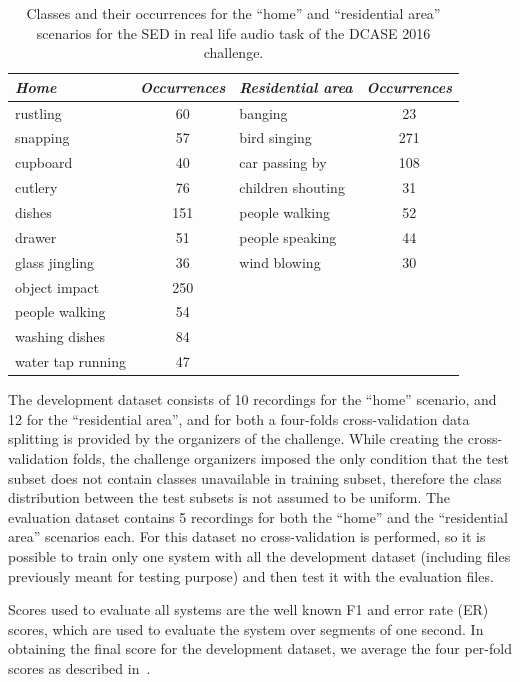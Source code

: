 \begin{table}[h]
	\centering
	\begin{tabular}{l c l c}\toprule
		\emph{Home} & \emph{Occurrences} & \emph{Residential area} & \emph{Occurrences}\\
		\midrule
		rustling & 60 & banging & 23\\
		snapping & 57 & bird singing & 271\\
		cupboard & 40 & car passing by & 108\\
		cutlery & 76 & children shouting & 31\\
		dishes & 151 & people walking & 52 \\
		drawer & 51 & people speaking & 44\\
		glass jingling & 36 & wind blowing & 30\\
		object impact & 250\\
		people walking & 54\\
		washing dishes & 84\\
		water tap running & 47\\
		\bottomrule
	\end{tabular}
	\caption[Classes of DCASE 2016 task 3 dataset]{Classes and their occurrences for the ``home'' and ``residential area'' scenarios for the SED in real life audio task of the DCASE 2016 challenge.}
	\label{tab:classes}
\end{table}

The development dataset consists of 10 recordings for the ``home'' scenario, and 12 for the ``residential area'', and for both a four-folds cross-validation data splitting is provided by the organizers of the challenge. While creating the cross-validation folds, the challenge organizers imposed the only condition that the test subset does not contain classes unavailable in training subset, therefore the class distribution between the test subsets is not assumed to be uniform.
The evaluation dataset contains 5 recordings for both the ``home'' and the ``residential area'' scenarios each. For this dataset no cross-validation is performed, so it is possible to train only one system with all the development dataset (including files previously meant for testing purpose) and then test it with the evaluation files.

Scores used to evaluate all systems are the well known F1 and error rate (ER) scores, which are used to evaluate the system over segments of one second. In obtaining the final score for the development dataset, we average the four per-fold scores as described in~\cite{mesaros2016tut}.

